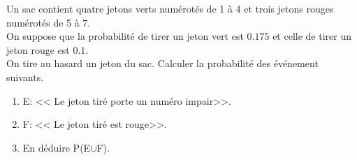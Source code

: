 \begin{exercice}
   Un sac contient quatre jetons verts  numérotés de 1 à 4 et trois jetons rouges numérotés de 5 à 7.\\ On suppose que la probabilité de tirer un jeton vert est $ 0.175 $ et celle de  tirer  un jeton rouge  est $ 0.1 $. \\ On tire au hasard un jeton du sac. 
     Calculer la probabilité des événement suivants.
     \begin{enumerate}
\item E: <<  Le jeton tiré porte un numéro  impair>>.
\item F: <<  Le  jeton tiré est rouge>>.
\item  En déduire P(E$ \cup $F).
 \end{enumerate}
 \end{exercice}   
   